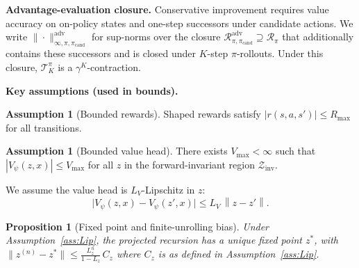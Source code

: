 \documentclass{article}
\theoremstyle{plain}
\newtheorem{proposition}[theorem]{Proposition}
\theoremstyle{definition}
\newtheorem{assumption}[theorem]{Assumption}
\theoremstyle{remark}
\newcommand{\norm}[1]{\left\lVert #1 \right\rVert}
\begin{document}
{\textbf{Advantage-evaluation closure.}
Conservative improvement requires value accuracy on on-policy states and one-step successors under candidate actions.
We write $\|\cdot\|_{\infty,\pi,\pi_{\mathrm{cand}}}^{\mathrm{adv}}$ for sup-norms over the closure $\mathcal{R}_{\pi,\pi_{\mathrm{cand}}}^{\mathrm{adv}} \supseteq \mathcal{R}_\pi$ that additionally contains these successors and is closed under $K$-step $\pi$-rollouts.
Under this closure, $\mathcal{T}^\pi_K$ is a $\gamma^K$-contraction.

\textbf{Key assumptions (used in bounds).}
\begin{assumption}[Bounded rewards]
\label{ass:bounded}
Shaped rewards satisfy $|r(s,a,s')|\le R_{\max}$ for all transitions.
\end{assumption}
\begin{assumption}[Bounded value head]
\label{ass:bounded_value_head}
There exists $V_{\max}<\infty$ such that $|V_\psi(z,x)| \le V_{\max}$ for all $z$ in the forward-invariant region $\mathcal{Z}_{\mathrm{inv}}$.
\end{assumption}
We assume the value head is $L_V$-Lipschitz in $z$:
\begin{equation}
\bigl|V_\psi(z,x)-V_\psi(z',x)\bigr| \le L_V\,\norm{z-z'}.
\label{eq:LV_def}
\end{equation}
\begin{proposition}[Fixed point and finite-unrolling bias]
\label{prop:banach}
Under Assumption~\ref{ass:Lip}, the projected recursion has a unique fixed point $z^*$, with $\|z^{(n)}-z^*\| \le \frac{L_z^n}{1-L_z}\,C_z$ where $C_z$ is as defined in Assumption~\ref{ass:Lip}.
\end{proposition}
}
\end{document}
